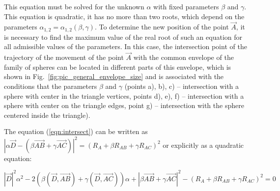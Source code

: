\documentclass[
11pt,%
tightenlines,%
twoside,%
onecolumn,%
nofloats,%
nobibnotes,%
nofootinbib,%
superscriptaddress,%
noshowpacs,%
centertags]%
{revtex4-2}
\begin{document}
This equation must be solved for the unknown $\alpha$ with fixed parameters $\beta$ and $\gamma$.
This equation is quadratic, it has no more than two roots, which depend on the parameters $\alpha_{1,2} = \alpha_{1,2}(\beta, \gamma)$.
To determine the new position of the point $\vec{A}$, it is necessary to find the maximum value of the real root of such an equation for all admissible values of the parameters.
In this case, the intersection point of the trajectory of the movement of the point $\vec{A}$ with the common envelope of the family of spheres can be located in different parts of this envelope, which is shown in Fig.~\ref{fig:pic_general_envelope_size} and is associated with the conditions that the parameters $\beta$ and $\gamma$ (points a), b), c) -- intersection with a sphere with center in the triangle vertices, points d), e), f) -- intersection with a sphere with center on the triangle edges, point g) -- intersection with the sphere centered inside the triangle).

The equation (\ref{eqn:intersect}) can be written as $|\alpha \vec{D} - (\beta \vec{AB} + \gamma \vec{AC})|^2 = (R_A + \beta R_{AB} + \gamma R_{AC})^2$ or explicitly as a quadratic equation:

\begin{equation}
|\vec{D}|^2 \alpha^2 - 2(\beta (\vec{D}, \vec{AB}) + \gamma (\vec{D}, \vec{AC})) \alpha + |\beta \vec{AB} + \gamma \vec{AC}|^2 - (R_A + \beta R_{AB} + \gamma R_{AC})^2 = 0
\end{equation}
\end{document}
